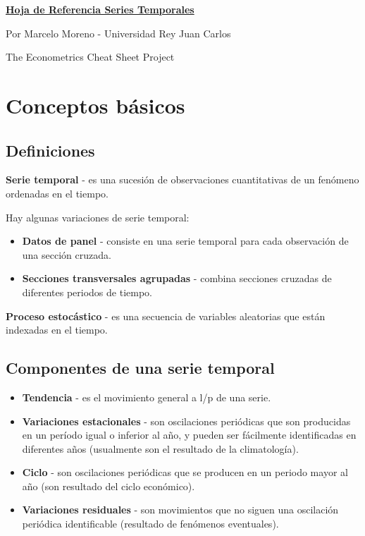 \documentclass[10pt, a4paper, landscape]{article}
\begin{document}
	\begin{multicols}{3}
		\begin{center}
			\textbf{\LARGE \href{https://github.com/marcelomijas/econometrics-cheatsheet}{Hoja de Referencia Series Temporales}}
			
			{\footnotesize Por Marcelo Moreno - Universidad Rey Juan Carlos}
			
			{\footnotesize The Econometrics Cheat Sheet Project}
		\end{center}
		
		\section*{Conceptos básicos}
		
		\subsection*{Definiciones}
		
		\textbf{Serie temporal} - es una sucesión de observaciones cuantitativas de un fenómeno ordenadas en el tiempo.
		
		Hay algunas variaciones de serie temporal:
		
		\begin{itemize}[leftmargin=*]
			\item \textbf{Datos de panel} - consiste en una serie temporal para cada observación de una sección cruzada.
			\item \textbf{Secciones transversales agrupadas} - combina secciones cruzadas de diferentes periodos de tiempo.
		\end{itemize}
		
		\textbf{Proceso estocástico} - es una secuencia de variables aleatorias que están indexadas en el tiempo.
		
		\subsection*{Componentes de una serie temporal}
		
		\begin{itemize}[leftmargin=*]
			\item \textbf{Tendencia} - es el movimiento general a l/p de una serie.
			\item \textbf{Variaciones estacionales} - son oscilaciones periódicas que son producidas en un período igual o inferior al año, y pueden ser fácilmente identificadas en diferentes años (usualmente son el resultado de la climatología).
			\item \textbf{Ciclo} - son oscilaciones periódicas que se producen en un periodo mayor al año (son resultado del ciclo económico).
			\item \textbf{Variaciones residuales} - son movimientos que no siguen una oscilación periódica identificable (resultado de fenómenos eventuales).
		\end{itemize}
		

\end{multicols}
\end{document}
